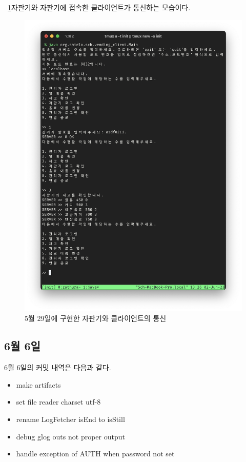 \documentclass{oblivoir}
\newcommand{\figref}[1]{\figurename~\ref{#1}}
\begin{document}
    \figref{fig:0529-client}\는 자판기와 자판기에 접속한 클라이언트가 통신하는 모습이다.
    \begin{figure}
        \centering
        \includegraphics[width=\textwidth]{images/dev-snapshop/0529-client}
        \caption{5월 29일에 구현한 자판기와 클라이언트의 통신}
        \label{fig:0529-client}
    \end{figure}

    \subsection{6월 6일}

    6월 6일의 커밋 내역은 다음과 같다.

    \begin{itemize}
        \item make artifacts
        \item set file reader charset utf-8
        \item rename LogFetcher isEnd to isStill
        \item debug glog outs not proper output
        \item handle exception of AUTH when password not set
    \end{itemize}
\end{document}
